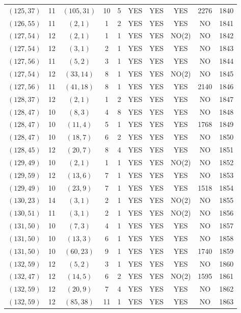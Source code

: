 \begin{longtable}{|c|c|c|c|c|c|c|c|c|c|}
$(125, 37)$ & 11 & $(105, 31)$ & 10 & 5 & YES & YES & YES & 2276 & 1840\\
$(126, 55)$ & 11 & $(2, 1)$ & 1 & 2 & YES & YES & YES & NO & 1841\\
$(127, 54)$ & 12 & $(2, 1)$ & 1 & 1 & YES & YES & NO(2) & NO & 1842\\
$(127, 54)$ & 12 & $(3, 1)$ & 2 & 1 & YES & YES & YES & NO & 1843\\
$(127, 56)$ & 11 & $(5, 2)$ & 3 & 1 & YES & YES & YES & NO & 1844\\
$(127, 54)$ & 12 & $(33, 14)$ & 8 & 1 & YES & YES & NO(2) & NO & 1845\\
$(127, 56)$ & 11 & $(41, 18)$ & 8 & 1 & YES & YES & YES & 2140 & 1846\\
$(128, 37)$ & 12 & $(2, 1)$ & 1 & 2 & YES & YES & YES & NO & 1847\\
$(128, 47)$ & 10 & $(8, 3)$ & 4 & 8 & YES & YES & YES & NO & 1848\\
$(128, 47)$ & 10 & $(11, 4)$ & 5 & 1 & YES & YES & YES & 1768 & 1849\\
$(128, 47)$ & 10 & $(18, 7)$ & 6 & 2 & YES & YES & YES & NO & 1850\\
$(128, 45)$ & 12 & $(20, 7)$ & 8 & 4 & YES & YES & YES & NO & 1851\\
$(129, 49)$ & 10 & $(2, 1)$ & 1 & 1 & YES & YES & NO(2) & NO & 1852\\
$(129, 59)$ & 12 & $(13, 6)$ & 7 & 1 & YES & YES & YES & NO & 1853\\
$(129, 49)$ & 10 & $(23, 9)$ & 7 & 1 & YES & YES & YES & 1518 & 1854\\
$(130, 23)$ & 14 & $(3, 1)$ & 2 & 1 & YES & YES & NO(2) & NO & 1855\\
$(130, 51)$ & 11 & $(3, 1)$ & 2 & 1 & YES & YES & NO(2) & NO & 1856\\
$(131, 50)$ & 10 & $(7, 3)$ & 4 & 1 & YES & YES & YES & NO & 1857\\
$(131, 50)$ & 10 & $(13, 3)$ & 6 & 1 & YES & YES & YES & NO & 1858\\
$(131, 50)$ & 10 & $(60, 23)$ & 9 & 1 & YES & YES & YES & 1740 & 1859\\
$(132, 59)$ & 12 & $(5, 2)$ & 3 & 1 & YES & YES & YES & NO & 1860\\
$(132, 47)$ & 12 & $(14, 5)$ & 6 & 2 & YES & YES & NO(2) & 1595 & 1861\\
$(132, 59)$ & 12 & $(20, 9)$ & 7 & 4 & YES & YES & YES & NO & 1862\\
$(132, 59)$ & 12 & $(85, 38)$ & 11 & 1 & YES & YES & YES & NO & 1863\\

\end{longtable}
